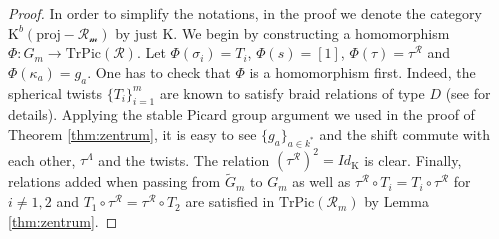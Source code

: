 \documentclass[12pt]{amsart}
\theoremstyle{plain}
\theoremstyle{remark}
\theoremstyle{definition}
\newcommand{\proj}{{\mathrm{proj}}}
\newcommand{\TrPic}{{\mathrm{TrPic}}}
\newcommand{\K}{{\mathrm{K}}}
\begin{document}
\begin{proof} In order to simplify the notations, in the proof we denote the category $\K^b(\proj-\mathcal{R_m})$ by just $\K$. We begin by constructing a homomorphism $\Phi \colon G_m \to \TrPic(\mathcal{R})$. Let $\Phi(\sigma_i) = T_i$, $\Phi(s) = [1]$, $\Phi(\tau) = \tau^{\mathcal{R}}$ and $\Phi(\kappa_a) = g_a$. One has to check that $\Phi$ is a homomorphism first. Indeed, the spherical twists $\{T_i\}_{i=1}^m$ are known to satisfy braid relations of type $D$ (see \cite{ST} for details). Applying the stable Picard group argument we used in the proof of Theorem \ref{thm:zentrum}, it is easy to see $\{g_a\}_{a\in k^*}$ and the shift commute with each other, $\tau^\Lambda$ and the twists. The relation $(\tau^{\mathcal{R}})^2 = Id_{\K}$ is clear. Finally, relations added when passing from $\widetilde{G}_m$ to $G_m$ as well as $\tau^{\mathcal{R}} \circ T_i = T_i \circ \tau^{\mathcal{R}} $ for $i \neq 1,2$ and $T_1 \circ \tau^{\mathcal{R}} =  \tau^{\mathcal{R}} \circ T_2$ are satisfied in $\TrPic(\mathcal{R}_m)$ by Lemma \ref{thm:zentrum}. 



\end{proof}
\end{document}
